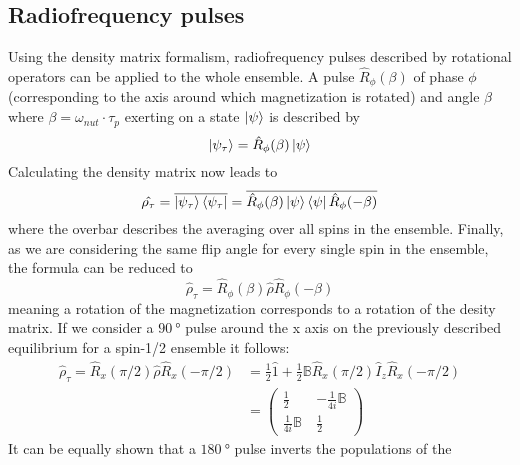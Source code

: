         \subsection{Radiofrequency pulses}
        Using the density matrix formalism, radiofrequency pulses described by rotational operators can be
        applied to the whole ensemble. A pulse $\hat R_\phi(\beta)$ of phase $\phi$ (corresponding
        to the axis around which magnetization is rotated) and angle $\beta$ where
        $\beta=\omega_{nut} \cdot \tau_p$ exerting on a state $\ket\psi$ is described by 
        \begin{equation}
            \ket{\psi_\tau}= \hat R_\phi(\beta)\ket\psi
        \end{equation}
        Calculating the density matrix now leads to
        \begin{equation}
            \hat {\rho_\tau} = \overline{\ket{\psi_\tau}\bra{\psi_\tau}} = \overline{\hat
                R_{\phi}(\beta)\ket\psi\bra\psi \hat R_\phi(-\beta)}
        \end{equation}
        where the overbar describes the averaging over all spins in the ensemble.
        Finally, as we are considering the same flip angle for every single spin in the ensemble,
        the formula can be reduced to
        \begin{equation}
            \hat\rho_\tau = \hat R_\phi(\beta) \hat \rho \hat R_\phi(-\beta)
        \end{equation}
        meaning a rotation of the magnetization corresponds to a rotation of the desity matrix.
        If we consider a $\SI{90}{\degree}$ pulse around the x axis on the previously described
        equilibrium for a spin-1/2 ensemble it follows:
        \begin{equation}
            \begin{split}
                \hat\rho_\tau = \hat R_x(\pi/2)\hat\rho\hat R_x(-\pi/2) &= \frac{1}{2} \hat 1 +
                \frac{1}{2} \mathbb{B}\hat R_x(\pi/2) \hat I_z \hat R_x(-\pi/2)\\
                &=
                \begin{pmatrix}
                    \frac{1}{2} & -\frac{1}{4i}\mathbb{B}\\
                    \frac{1}{4i}\mathbb{B}\ & \frac{1}{2}
                \end{pmatrix}
            \end{split}
        \end{equation}
        It can be equally shown that a $\SI{180}{\degree}$ pulse inverts the populations of the
